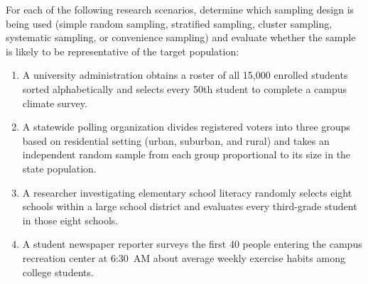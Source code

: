 \begin{exercise}
  For each of the following research scenarios, determine which sampling design
  is being used (simple random sampling, stratified sampling, cluster sampling,
  systematic sampling, or convenience sampling) and evaluate whether the sample
  is likely to be representative of the target population:
  \begin{enumerate}
  \item A university administration obtains a roster of all 15,000 enrolled
    students sorted alphabetically and selects every 50th student to complete a
    campus climate survey.
  \item A statewide polling organization divides registered voters into three
    groups based on residential setting (urban, suburban, and rural) and takes
    an independent random sample from each group proportional to its size in the
    state population.
  \item A researcher investigating elementary school literacy randomly selects
    eight schools within a large school district and evaluates every third-grade
    student in those eight schools.
  \item A student newspaper reporter surveys the first 40 people entering the
    campus recreation center at 6:30~AM about average weekly exercise habits
    among college students.
  \end{enumerate}
\end{exercise}



